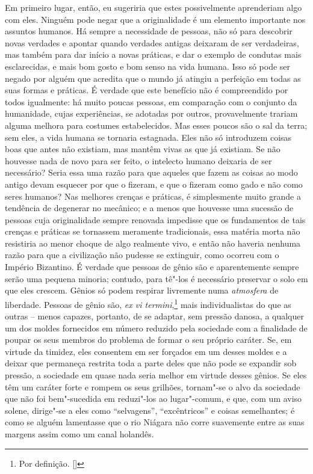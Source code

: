 Em primeiro lugar, então, eu sugeriria que estes possivelmente
aprenderiam algo com eles. Ninguém pode negar que
a originalidade é um elemento importante nos assuntos humanos. Há sempre a
necessidade de pessoas, não só para descobrir novas verdades e apontar quando
verdades antigas deixaram de ser verdadeiras, mas também para dar início a novas
práticas, e dar o exemplo de condutas mais esclarecidas, e
mais bom gosto e bom senso na vida humana. Isso só pode ser negado
por alguém que acredita que o mundo já atingiu a
perfeição em todas as suas formas e práticas. É verdade que este
benefício não é compreendido por todos igualmente: há
muito poucas pessoas, em comparação com o conjunto da humanidade, cujas
experiências, se adotadas por outros, provavelmente trariam alguma
melhora para costumes estabelecidos. Mas esses poucos são o sal da terra; sem
eles, a vida humana se tornaria estagnada. Eles não só 
introduzem coisas boas que antes não existiam, mas mantêm
vivas as que já existiam. Se não houvesse nada de novo para
ser feito, o intelecto humano deixaria de ser necessário? Seria essa uma razão 
para que aqueles que fazem as coisas ao modo antigo
devam esquecer por que o fizeram, e que o fizeram como gado e não como
seres humanos? Nas melhores crenças e práticas, é simplesmente muito
grande a tendência de degenerar no mecânico; e a menos que houvesse uma
sucessão de pessoas cuja originalidade sempre renovada impedisse que os
fundamentos de tais crenças e práticas se tornassem meramente
tradicionais, essa matéria morta não resistiria ao menor choque de algo
realmente vivo, e então não haveria nenhuma razão para que a
civilização não pudesse se extinguir, como ocorreu com o Império
Bizantino. É verdade que pessoas de gênio são e aparentemente sempre
serão uma pequena minoria; contudo, para tê"-los é necessário preservar
o solo em que eles crescem. Gênios só podem respirar livremente numa
\textit{atmosfera} de liberdade. Pessoas de gênio são, \textit{ex vi
termini},\footnote{ Por definição. []} 
mais individualistas do que as outras – menos capazes,
portanto, de se adaptar, sem pressão danosa, a qualquer um dos moldes
fornecidos em número reduzido pela sociedade com a finalidade de poupar
os seus membros do problema de formar o seu próprio caráter. Se, em
virtude da timidez, eles consentem em ser forçados em um desses moldes
e a deixar que permaneça restrita toda a parte deles que não pode
se expandir sob pressão, a sociedade em quase nada seria melhor em virtude
desses gênios. Se eles têm um caráter forte e rompem os seus grilhões,
tornam"-se o alvo da sociedade que não foi bem"-sucedida em reduzi"-los ao
lugar"-comum, e que, com um aviso solene, dirige"-se a eles como
“selvagens”, “excêntricos” e coisas semelhantes; é como se alguém
lamentasse que o rio Niágara não corre suavemente entre as suas
margens assim como um canal holandês.

